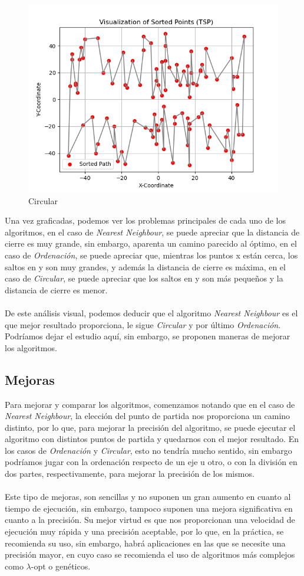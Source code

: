 \documentclass[11pt,openany]{book}
\begin{document}
\begin{figure}[H]
      \centering
      \includegraphics[width=0.6\linewidth]{assets/Img/CircVisual.png}
      \caption{Circular}
      \label{fig:circular}
\end{figure}
Una vez graficadas, podemos ver los problemas principales de cada uno de los algoritmos,
en el caso de \textit{Nearest Neighbour}, se puede apreciar que la distancia de cierre
es muy grande, sin embargo, aparenta un camino parecido al óptimo, en el caso de 
\textit{Ordenación}, se puede apreciar que, mientras los puntos x están cerca, los saltos
en y son muy grandes, y además la distancia de cierre es máxima, en el caso de \textit{Circular},
se puede apreciar que los saltos en y son más pequeños y la distancia de cierre es menor.
\\ \\ 
De este análisis visual, podemos deducir que el algoritmo \textit{Nearest Neighbour} es el
que mejor resultado proporciona, le sigue \textit{Circular} y por último \textit{Ordenación}.
Podríamos dejar el estudio aquí, sin embargo, se proponen maneras de mejorar los algoritmos.
\subsection{Mejoras}
Para mejorar y comparar los algoritmos, comenzamos notando que en el caso de 
\textit{Nearest Neighbour}, la elección del punto de partida nos proporciona un camino
distinto, por lo que, para mejorar la precisión del algoritmo, se puede ejecutar
el algoritmo con distintos puntos de partida y quedarnos con el mejor resultado.
En los casos de \textit{Ordenación} y \textit{Circular}, esto no tendría mucho sentido, 
sin embargo podríamos jugar con la ordenación respecto de un eje u otro, o con la
división en dos partes, respectivamente, para mejorar la precisión de los mismos.
\\ \\
Este tipo de mejoras, son sencillas y no suponen un gran aumento en cuanto al tiempo
de ejecución, sin embargo, tampoco suponen una mejora significativa en cuanto a la
precisión. Su mejor virtud es que nos proporcionan una velocidad de ejecución muy
rápida y una precisión aceptable, por lo que, en la práctica, se recomienda su uso,
sin embargo, habrá aplicaciones en las que se necesite una precisión mayor, en cuyo 
caso se recomienda el uso de algoritmos más complejos como $\lambda$-opt o genéticos.
\end{document}
